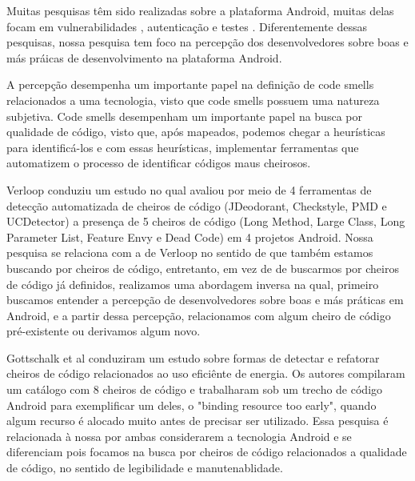 Muitas pesquisas t\^em sido realizadas sobre a plataforma Android, muitas delas focam em vulnerabilidades \cite{Y, F, G, X, P, D, E}, autentica\c{c}\~ao \cite{T, Yamashita6405287, R} e testes \cite{J, M}. Diferentemente dessas pesquisas, nossa pesquisa tem foco na percep\c{c}\~ao dos desenvolvedores sobre boas e m\'as pr\'aicas de desenvolvimento na plataforma Android. 

A percep\c{c}\~ao desempenha um importante papel na defini\c{c}\~ao de code smells relacionados a uma tecnologia, visto que code smells possuem uma natureza subjetiva. Code smells desempenham um importante papel na busca por qualidade de c\'odigo, visto que, ap\'os mapeados, podemos chegar a heur\'isticas para identific\'a-los e com essas heur\'isticas, implementar ferramentas que automatizem o processo de identificar c\'odigos maus cheirosos.

Verloop \cite{MobileSmells:13} conduziu um estudo no qual avaliou por meio de 4 ferramentas de detec\c{c}\~ao automatizada de cheiros de c\'odigo (JDeodorant, Checkstyle, PMD e UCDetector) a presen\c{c}a de 5 cheiros de c\'odigo (Long Method, Large Class, Long Parameter List, Feature Envy e Dead Code) em 4 projetos Android. Nossa pesquisa se relaciona com a de Verloop no sentido de que tamb\'em estamos buscando por cheiros de c\'odigo, entretanto, em vez de de buscarmos por cheiros de c\'odigo j\'a definidos, realizamos uma abordagem inversa na qual, primeiro buscamos entender a percep\c{c}\~ao de desenvolvedores sobre boas e m\'as pr\'aticas em Android, e a partir dessa percep\c{c}\~ao, relacionamos com algum cheiro de c\'odigo pr\'e-existente ou derivamos algum novo.

Gottschalk et al \cite{EnergyAndroidSmells} conduziram um estudo sobre formas de detectar e refatorar cheiros de c\'odigo relacionados ao uso efici\^ente de energia. Os autores compilaram um cat\'alogo com 8 cheiros de c\'odigo e trabalharam sob um trecho de c\'odigo Android para exemplificar um deles, o "binding resource too early", quando algum recurso \'e alocado muito antes de precisar ser utilizado. Essa pesquisa \'e relacionada \`a nossa por ambas considerarem a tecnologia Android e se diferenciam pois focamos na busca por cheiros de c\'odigo relacionados a qualidade de c\'odigo, no sentido de legibilidade e manutenablidade.

